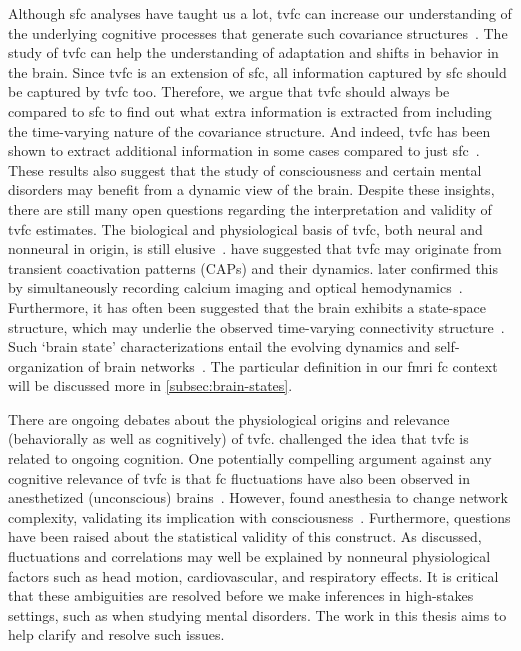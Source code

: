 Although \gls{sfc} analyses have taught us a lot, \gls{tvfc} can increase our understanding of the underlying cognitive processes that generate such covariance structures~\parencite{Cohen2018}.
The study of \gls{tvfc} can help the understanding of adaptation and shifts in behavior in the brain.
%
Since \gls{tvfc} is an extension of \gls{sfc}, all information captured by \gls{sfc} should be captured by \gls{tvfc} too.
Therefore, we argue that \gls{tvfc} should always be compared to \gls{sfc} to find out what extra information is extracted from including the time-varying nature of the covariance structure.
And indeed, \gls{tvfc} has been shown to extract additional information in some cases compared to just \gls{sfc}~\parencite[see e.g.][]{Rashid2016, Jin2017, Liegeois2019, Luppi2019, Varley2020, Vidaurre2021, Coppola2022}.
These results also suggest that the study of consciousness and certain mental disorders may benefit from a dynamic view of the brain.
%
Despite these insights, there are still many open questions regarding the interpretation and validity of \gls{tvfc} estimates.
The biological and physiological basis of \gls{tvfc}, both neural and nonneural in origin, is still elusive~\parencite{Lurie2020}.
\textcite{Liu2013, Petridou2013} have suggested that \gls{tvfc} may originate from transient coactivation patterns (CAPs) and their dynamics.
\textcite{Matsui2019} later confirmed this by simultaneously recording calcium imaging and optical hemodynamics~\parencite[see][for a review of multi-modal approaches]{Thompson2018b}.
Furthermore, it has often been suggested that the brain exhibits a state-space structure, which may underlie the observed time-varying connectivity structure~\parencite{Hutchison2013}.
Such `brain state' characterizations entail the evolving dynamics and self-organization of brain networks~\parencite{Kringelbach2020}.
The particular definition in our \gls{fmri} \gls{fc} context will be discussed more in \cref{subsec:brain-states}.

There are ongoing debates about the physiological origins and relevance (behaviorally as well as cognitively) of \gls{tvfc}.
\textcite{Laumann2017} challenged the idea that \gls{tvfc} is related to ongoing cognition.
One potentially compelling argument against any cognitive relevance of \gls{tvfc} is that \gls{fc} fluctuations have also been observed in anesthetized (unconscious) brains~\parencite{Hutchison2013b}.
However, \textcite{Demertzi2019} found anesthesia to change network complexity, validating its implication with consciousness~\parencite[see also][]{Varley2020b}.
Furthermore, questions have been raised about the statistical validity of this construct.
As \textcite{Lurie2020} discussed, fluctuations and correlations may well be explained by nonneural physiological factors such as head motion, cardiovascular, and respiratory effects.
%
It is critical that these ambiguities are resolved before we make inferences in high-stakes settings, such as when studying mental disorders.
The work in this thesis aims to help clarify and resolve such issues.
